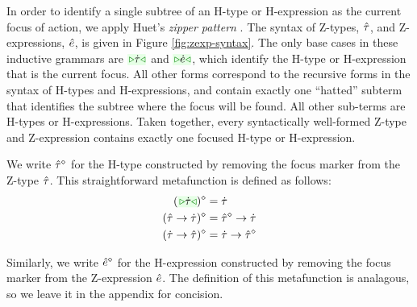 In order to identify a single subtree of an H-type or H-expression as the current focus of action, we apply Huet's \emph{zipper pattern} \cite{JFP::Huet1997}. The syntax of Z-types, $\hat{\tau}$, and Z-expressions, $\hat{e}$, is given in Figure \ref{fig:zexp-syntax}. The only base cases in these inductive grammars are $\zwsel{\htau}$ and $\zwsel{\hexp}$, which identify the H-type or H-expression that is the current focus. All other forms correspond to the recursive forms in the syntax of H-types and H-expressions, and contain exactly one ``hatted'' subterm that identifies the subtree where the focus will be found. All other sub-terms are H-types or H-expressions. Taken together, every syntactically well-formed Z-type and Z-expression contains exactly one focused H-type or H-expression.

We write $\hat{\tau}^{\diamond}$ for the H-type constructed by removing the focus marker from the Z-type $\hat{\tau}$. This straightforward metafunction is defined as follows:
\begin{align*}
\removeSel{(\zwsel{\htau})} & = \htau\\
\removeSel{(\tarr{\ztau}{\htau})} & = \tarr{\removeSel{\ztau}}{\htau}\\
\removeSel{(\tarr{\htau}{\ztau})} & = \tarr{\htau}{\removeSel{\ztau}}
\end{align*}

Similarly, we write $\hat{e}^{\diamond}$ for the H-expression constructed by removing the focus marker from the Z-expression $\hat{e}$. The definition of this metafunction is analagous, so we leave it in the appendix for concision.

